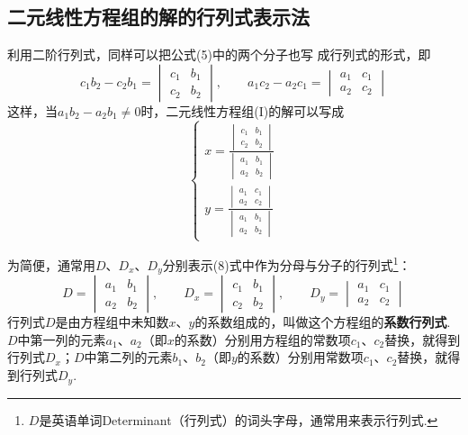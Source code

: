 \subsection{二元线性方程组的解的行列式表示法}
利用二阶行列式，同样可以把公式(5)中的两个分子也写
成行列式的形式，即
\[c_1b_2-c_2b_1=\begin{vmatrix}
  c_1&b_1\\c_2&b_2
\end{vmatrix},\qquad a_1c_2-a_2c_1=\begin{vmatrix}
  a_1&c_1\\ a_2&c_2
\end{vmatrix}\]
这样，当$a_1b_2-a_2b_1\ne 0$时，二元线性方程组(I)的解可以写成
\begin{equation}
  \begin{cases}
    x=\frac{\begin{vmatrix}
      c_1&b_1\\c_2&b_2
    \end{vmatrix}}{\begin{vmatrix}
      a_1&b_1\\a_2&b_2
    \end{vmatrix}}\\
    y=\frac{\begin{vmatrix}
      a_1&c_1\\a_2&c_2
    \end{vmatrix}}{\begin{vmatrix}
      a_1&b_1\\a_2&b_2
    \end{vmatrix}}
  \end{cases}\tag{8}
\end{equation}

为简便，通常用$D$、$D_x$、$D_y$分别表示(8)式中作为分母与分子的行列式\footnote{$D$是英语单词Determinant（行列式）的词头字母，通常用来表示行列式.}：
\[D=\begin{vmatrix}
  a_1&b_1\\a_2&b_2
\end{vmatrix},\qquad D_x=\begin{vmatrix}
  c_1&b_1\\c_2&b_2
\end{vmatrix},\qquad D_y=\begin{vmatrix}
  a_1&c_1\\a_2&c_2
\end{vmatrix}\]
行列式$D$是由方程组中未知数$x$、$y$的系数组成的，叫做这个方程组的\textbf{系数行列式}. $D$中第一列的元素$a_1$、$a_2$（即$x$的系数）分别用方程组的常数项$c_1$、$c_2$替换，就得到行列式$D_x$；$D$中第二列的元素$b_1$、$b_2$（即$y$的系数）分别用常数项$c_1$、$c_2$替换，就得到行列式$D_y$.

